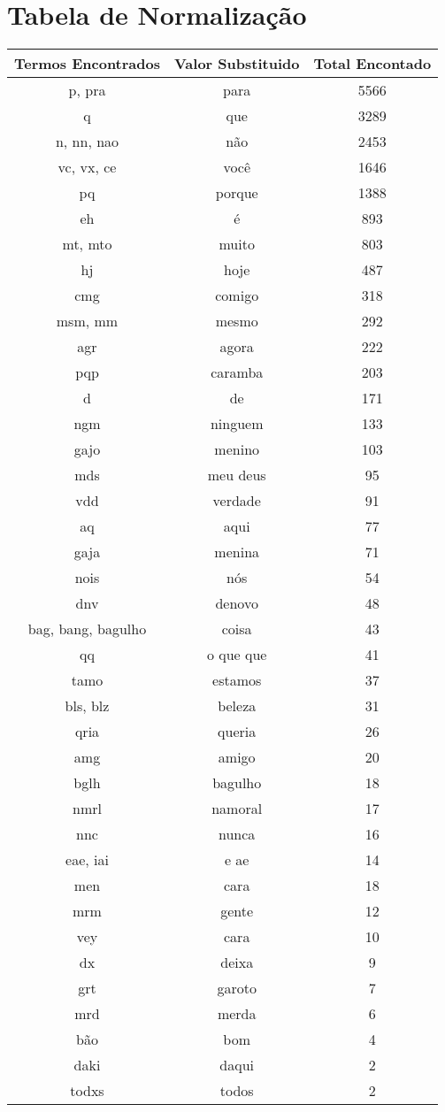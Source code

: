 \chapter{Tabela de Normalização}
\label{app:tabelanorm}

\begin{table}[h]
\centering
\resizebox{12cm}{!} {
    \begin{tabular}{|c|c|c|}
    \hline
    \textbf{Termos Encontrados} & \textbf{Valor Substituido} & \textbf{Total Encontado} \\ \hline
    p, pra & para & 5566 \\
    q & que & 3289 \\
    n, nn, nao & não & 2453 \\
    vc, vx, ce & você & 1646 \\
    pq & porque & 1388 \\
    eh & é & 893 \\
    mt, mto & muito & 803 \\
    hj & hoje & 487 \\
    cmg & comigo & 318 \\
    msm, mm & mesmo & 292 \\
    agr & agora & 222 \\
    pqp & caramba & 203 \\
    d & de & 171 \\
    ngm & ninguem & 133 \\
    gajo & menino & 103 \\
    mds & meu deus & 95 \\
    vdd & verdade & 91 \\
    aq & aqui & 77 \\
    gaja & menina & 71 \\
    nois & nós & 54 \\
    dnv & denovo & 48 \\
    bag, bang, bagulho & coisa & 43 \\
    qq & o que que & 41 \\
    tamo & estamos & 37 \\
    bls, blz & beleza & 31 \\
    qria & queria & 26 \\
    amg & amigo & 20 \\
    bglh & bagulho & 18 \\
    nmrl & namoral & 17 \\
    nnc & nunca & 16 \\
    eae, iai & e ae & 14 \\
    men & cara & 18 \\
    mrm & gente & 12 \\
    vey & cara & 10 \\
    dx & deixa & 9 \\
    grt & garoto & 7 \\
    mrd & merda & 6 \\
    bão & bom & 4 \\
    daki & daqui & 2 \\
    todxs & todos & 2 \\
    \hline
    \end{tabular}
}
\end{table}